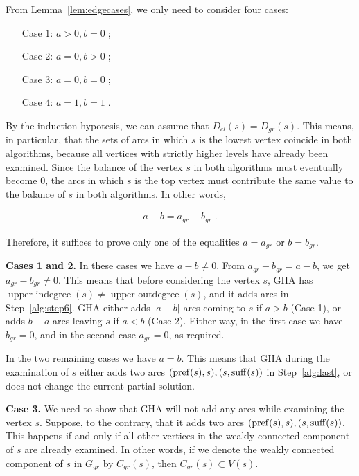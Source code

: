 From Lemma~\ref{lem:edgecases}, we only need to consider four cases:
\begin{enumerate}
\item[Case $1$:] $ a> 0, b = 0\; $;
\item[Case $2$:] $ a = 0, b> 0\; $;
\item[Case $3$:] $ a = 0, b = 0\; $;
\item[Case $4$:] $ a = 1, b = 1\; $.
\end{enumerate}

By the induction hypotesis, we can assume that $ D_{cl} (s) = D_{gr} (s) $. This means, in particular, that the sets of arcs in which $ s $ is the lowest vertex coincide in both algorithms, because all vertices with strictly higher levels have already been examined. Since the balance of the vertex $s$ in both algorithms must eventually become $ 0 $, the arcs in which $ s $ is the top vertex must contribute the same value to the balance of $ s $ in both algorithms. In other words,

\begin{align*}
\label{eqn:balance}
    a-b = a_{gr}-b_{gr} \; .
\end{align*}

Therefore, it suffices to prove only one of the equalities $ a = a_{gr} $ or $ b = b_{gr} $.

\textbf {Cases 1 and 2.} In these cases we have $a-b\ne 0$. From $ a_{gr} - b_{gr} = a-b$, we get $ a_{gr} - b_{gr}\ne 0$. This means that before considering the vertex $s$, GHA has $\operatorname{upper-indegree}(s) \neq \operatorname{upper-outdegree}(s)$, and it adds arcs in Step~\ref{alg:step6}. GHA either adds $|a-b| $ arcs coming to $ s $ if $ a> b $ (Case 1), or adds $ b-a$ arcs leaving $ s $ if $ a <b $ (Case 2). Either way, in the first case we have $ b_{gr} = 0 $, and in the second case $ a_{gr} = 0 $, as required.

In the two remaining cases we have $a=b$. This means that GHA during the examination of $ s $ either adds two arcs $ (\operatorname{pref} (s), s), (s, \operatorname{suff} (s)) $ in Step~\ref{alg:last}, or does not change the current partial solution.

\textbf {Case 3.} We need to show that GHA will not add any arcs while examining the vertex $ s $. Suppose, to the contrary, that it adds two arcs $ (\operatorname{pref} (s), s), (s, \operatorname{suff} (s)) $. This happens if and only if all other vertices in the weakly connected component of $ s $ are already examined. In other words, if we denote the weakly connected component of $ s $ in $ G_{gr} $ by $ C_{gr} (s) $, then $ C_{gr} (s) \subset V (s) $.

